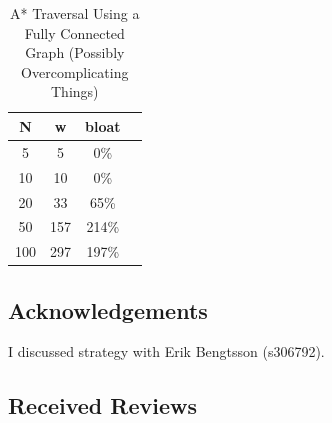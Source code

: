 \begin{table}
    \centering
    \begin{tabular}{|c|c|c|c|}
        \hline
        N & w & bloat \\
        \hline
        5 & 5 & 0\% \\
        10 & 10 & 0\% \\
        20 & 33 & 65\% \\
        50 & 157 & 214\% \\
        100 & 297 & 197\% \\
        \hline
    \end{tabular}
    \caption{A* Traversal Using a Fully Connected Graph (Possibly Overcomplicating Things)}
    \label{tab:astarfullyconnected}
\end{table}


\subsection{Acknowledgements}

I discussed strategy with Erik Bengtsson (s306792).

\subsection{Received Reviews}

